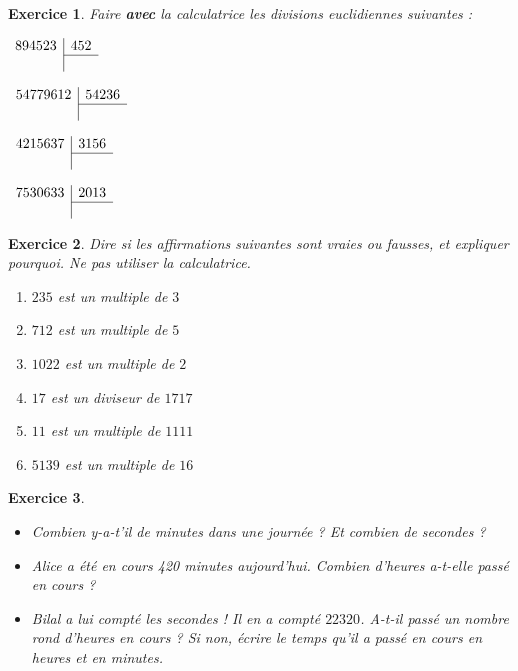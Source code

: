 \documentclass[a4paper]{article}
\theoremstyle{exostyle}
\newtheorem{exercice}{Exercice}
\begin{document}
\begin{exercice}
	Faire \textbf{avec} la calculatrice les divisions euclidiennes suivantes :
	\begin{enumerate}
		\begin{minipage}{0.45\linewidth}
			\item $\begin{array}{r|r}
					894523 & 452 \\
					\cline{2-2}
					       &
				\end{array}$
			\item $\begin{array}{r|r}
					54779612 & 54236 \\
					\cline{2-2}
					         &
				\end{array}$
		\end{minipage}
		\begin{minipage}{0.45\linewidth}
			\item $\begin{array}{r|r}
					4215637 & 3156 \\
					\cline{2-2}
					        &
				\end{array}$
			\item $\begin{array}{r|r}
					7530633 & 2013 \\
					\cline{2-2}
					        &
				\end{array}$
		\end{minipage}
	\end{enumerate}
\end{exercice}

\begin{exercice}
	Dire si les affirmations suivantes sont vraies ou fausses, et expliquer pourquoi. Ne pas utiliser la calculatrice.
	\begin{enumerate}
		\item $235$ est un multiple de $3$
		\item $712$ est un multiple de $5$
		\item $1022$ est un multiple de $2$
		\item $17$ est un diviseur de $1717$
		\item $11$ est un multiple de $1111$
		\item $5139$ est un multiple de $16$
	\end{enumerate}
\end{exercice}

\begin{exercice}
	\begin{itemize}
		\item Combien y-a-t'il de minutes dans une journée ? Et combien de secondes ?
		\item Alice a été en cours 420 minutes aujourd'hui. Combien d'heures a-t-elle passé en cours ?
		\item Bilal a lui compté les secondes ! Il en a compté $22320$. A-t-il passé un nombre rond d'heures en cours ? Si non, écrire le temps qu'il a passé en cours en heures et en minutes.
	\end{itemize}
\end{exercice}
\end{document}
